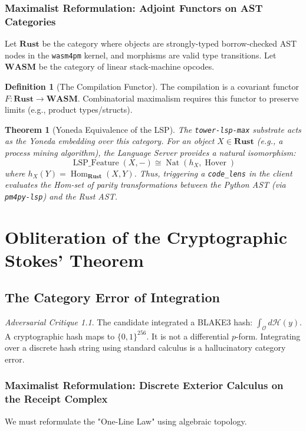 \documentclass[11pt,a4paper]{book}
\theoremstyle{definition}
\newtheorem{definition}{Definition}[section]
\theoremstyle{plain}
\newtheorem{theorem}{Theorem}[section]
\theoremstyle{remark}
\newtheorem{critique}{Adversarial Critique}[section]
\begin{document}
\subsection{Maximalist Reformulation: Adjoint Functors on AST Categories}
Let $\mathbf{Rust}$ be the category where objects are strongly-typed borrow-checked AST nodes in the \texttt{wasm4pm} kernel, and morphisms are valid type transitions. Let $\mathbf{WASM}$ be the category of linear stack-machine opcodes.

\begin{definition}[The Compilation Functor]
The compilation is a covariant functor $F: \mathbf{Rust} \to \mathbf{WASM}$. Combinatorial maximalism requires this functor to preserve limits (e.g., product types/structs).
\end{definition}

\begin{theorem}[Yoneda Equivalence of the LSP]
The \texttt{tower-lsp-max} substrate acts as the Yoneda embedding over this category. For an object $X \in \mathbf{Rust}$ (e.g., a process mining algorithm), the Language Server provides a natural isomorphism:
\begin{equation}
\operatorname{LSP\_Feature}(X, -) \cong \operatorname{Nat}(h_X, \operatorname{Hover})
\end{equation}
where $h_X(Y) = \operatorname{Hom}_{\mathbf{Rust}}(X, Y)$. Thus, triggering a \texttt{code\_lens} in the client evaluates the Hom-set of parity transformations between the Python AST (via \texttt{pm4py-lsp}) and the Rust AST.
\end{theorem}

\chapter{Obliteration of the Cryptographic Stokes' Theorem}
\section{The Category Error of Integration}
\begin{critique}
The candidate integrated a BLAKE3 hash: $\int_{\mathcal{O}} d\mathcal{H}(y)$. A cryptographic hash maps to $\{0,1\}^{256}$. It is not a differential $p$-form. Integrating over a discrete hash string using standard calculus is a hallucinatory category error.
\end{critique}

\subsection{Maximalist Reformulation: Discrete Exterior Calculus on the Receipt Complex}
We must reformulate the "One-Line Law" using algebraic topology. 
\end{document}
